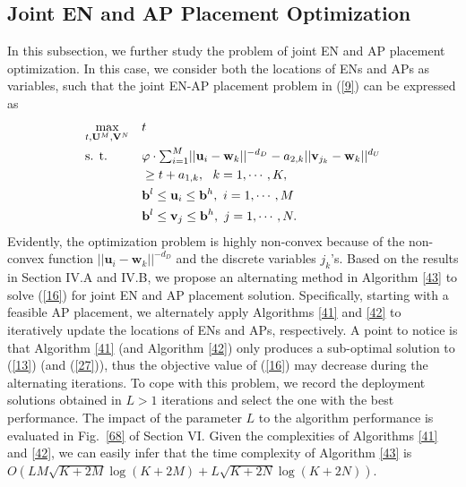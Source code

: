 \documentclass[journal, draftcls, one column, 12pt]{IEEEtran}
\begin{document}
\subsection{Joint EN and AP Placement Optimization}
In this subsection, we further study the problem of joint EN and AP placement optimization. In this case, we consider both the locations of ENs and APs as variables, such that the joint EN-AP placement problem in (\ref{9}) can be expressed as
\begin{equation}
\label{16}
   \begin{aligned}
    & \underset{t,\mathbf{U}^M,\mathbf{V}^N}{\text{max}} & &  t\\
    & \text{s. t.}  & & \varphi\cdot \mathsmaller\sum_{i=1}^M ||\mathbf{u}_i -\mathbf{w}_k||^{-d_D} - a_{2,k} ||\mathbf{v}_{j_k} - \mathbf{w}_k||^{d_U}\\
    & & & \geq t + a_{1,k}, \ \ k=1,\cdots,K,\\
    & & & \mathbf{b}^l\leq \mathbf{u}_i\leq \mathbf{b}^h,\ i=1,\cdots,M \\
    & & & \mathbf{b}^l\leq \mathbf{v}_j\leq \mathbf{b}^h,\ j=1,\cdots,N.
   \end{aligned}
\end{equation}
Evidently, the optimization problem is highly non-convex because of the non-convex function $||\mathbf{u}_i -\mathbf{w}_k||^{-d_D}$ and the discrete variables $j_k$'s. Based on the results in Section IV.A and IV.B, we propose an alternating method in Algorithm \ref{43} to solve (\ref{16}) for joint EN and AP placement solution. Specifically, starting with a feasible AP placement, we alternately apply Algorithms \ref{41} and \ref{42} to iteratively update the locations of ENs and APs, respectively. A point to notice is that Algorithm \ref{41} (and Algorithm \ref{42}) only produces a sub-optimal solution to (\ref{13}) (and (\ref{27})), thus the objective value of (\ref{16}) may decrease during the alternating iterations. To cope with this problem, we record the deployment solutions obtained in $L>1$ iterations and select the one with the best performance. The impact of the parameter $L$ to the algorithm performance is evaluated in Fig.~\ref{68} of Section VI. Given the complexities of Algorithms \ref{41} and \ref{42}, we can easily infer that the time complexity of Algorithm \ref{43} is $O\left(LM\sqrt{K+2M}\log \left(K+2M\right)+ L\sqrt{K+2N}\log \left(K+2N\right) \right)$.
\end{document}
